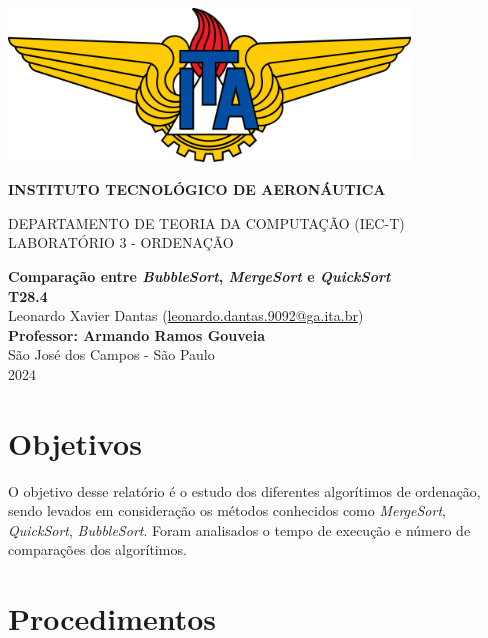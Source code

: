 \documentclass[12pt,a4paper,oneside]{article}
\begin{document}
\begin{center}

\includegraphics[width=0.8\textwidth]{Ita-logo.png}

{\Large \bf INSTITUTO TECNOLÓGICO DE AERONÁUTICA}

{\Large DEPARTAMENTO DE TEORIA DA COMPUTAÇÃO (IEC-T)}\\
{LABORATÓRIO 3 - ORDENAÇÃO}\\[2.0cm]

\vspace{1cm}

{\bf \large Comparação entre \textit{BubbleSort}, \textit{MergeSort} e \textit{QuickSort}}\\[2.5cm]

{\textbf{T28.4}\\
Leonardo Xavier Dantas (\href{mailto:leonardo.dantas.9092@ga.ita.br}{leonardo.dantas.9092@ga.ita.br})
}\\[2.0cm]

{\bf Professor: Armando Ramos Gouveia}\\[2.5cm]

{\large São José dos Campos - São Paulo}\\[0.2cm]
2024

\end{center}

\newpage

\section{Objetivos}

\quad O objetivo desse relatório é o estudo dos diferentes algorítimos de ordenação, sendo levados em consideração os métodos conhecidos como \textit{MergeSort}, \textit{QuickSort}, \textit{BubbleSort}. Foram analisados o tempo de execução e número de comparações dos algorítimos. 

\section{Procedimentos}
\end{document}
